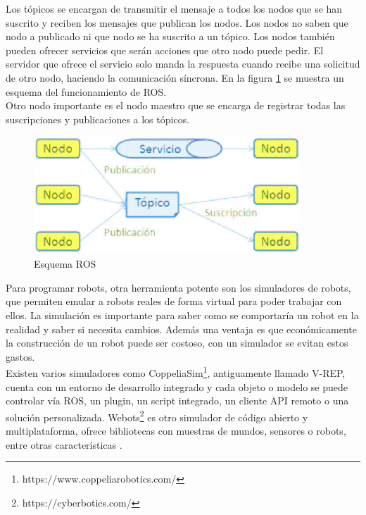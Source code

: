 Los tópicos se encargan de transmitir el mensaje a todos los nodos que se han suscrito y reciben los mensajes que publican los nodos. Los nodos no saben que nodo a publicado ni que nodo se ha suscrito a un tópico. Los nodos también pueden ofrecer servicios que serán acciones que otro nodo puede pedir. El servidor que ofrece el servicio solo manda la respuesta cuando recibe una solicitud de otro nodo, haciendo la comunicación síncrona. En la figura \ref{fig:ros} se muestra un esquema del funcionamiento de ROS\cite{ros2}.\\

Otro nodo importante es el nodo maestro que se encarga de registrar todas las suscripciones y publicaciones a los tópicos.

\begin{figure}[H]
    \centering
    \includegraphics[width=10cm, keepaspectratio]{img/ros.png}
    \caption{Esquema ROS}
    \label{fig:ros}
\end{figure}

Para programar robots, otra herramienta potente son los simuladores de robots, que permiten emular a robots reales de forma virtual para poder trabajar con ellos. La simulación es importante para saber como se comportaría un robot en la realidad y saber si necesita cambios. Además una ventaja es que económicamente la construcción de un robot puede ser costoso, con un simulador se evitan estos gastos.\\

Existen varios simuladores como CoppeliaSim\footnote{https://www.coppeliarobotics.com/}, antiguamente llamado V-REP, cuenta con un entorno de desarrollo integrado y cada objeto o modelo se puede controlar vía ROS, un plugin, un script integrado, un cliente API remoto o una solución personalizada\cite{sim}.  Webots\footnote{https://cyberbotics.com/} es otro simulador de código abierto y multiplataforma, ofrece bibliotecas con muestras de mundos, sensores o robots, entre otras características \cite{körber2021comparing}.\\


